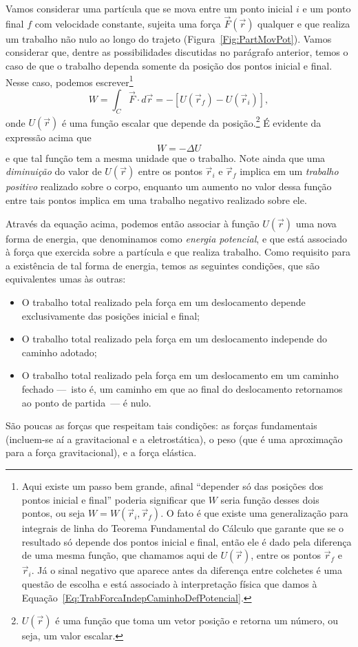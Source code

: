 Vamos considerar uma partícula que se mova entre um ponto inicial $i$ e um ponto final $f$ com velocidade constante, sujeita uma força $\vec{F}(\vec{r})$ qualquer e que realiza um trabalho não nulo ao longo do trajeto (Figura~\ref{Fig:PartMovPot}). Vamos considerar que, dentre as possibilidades discutidas no parágrafo anterior, temos o caso de que o trabalho dependa somente da posição dos pontos inicial e final. Nesse caso, podemos escrever\footnote{Aqui existe um passo bem grande, afinal ``depender só das posições dos pontos inicial e final'' poderia significar que $W$ seria função desses dois pontos, ou seja $W = W(\vec{r}_i, \vec{r}_f)$. O fato é que existe uma generalização para integrais de linha do Teorema Fundamental do Cálculo que garante que se o resultado só depende dos pontos inicial e final, então ele é dado pela diferença de uma mesma função, que chamamos aqui de $U(\vec{r})$, entre os pontos $\vec{r}_f$ e $\vec{r}_i$. Já o sinal negativo que aparece antes da diferença entre colchetes é uma questão de escolha e está associado à interpretação física que damos à Equação~\eqref{Eq:TrabForcaIndepCaminhoDefPotencial}.}
\begin{equation}\label{Eq:TrabForcaIndepCaminhoDefPotencial}
    W = \int_C \vec{F}\cdot d\vec{r} = -[U(\vec{r}_f) - U(\vec{r}_i)],
\end{equation}
%
onde $U(\vec{r})$ é uma função escalar que depende da posição.\footnote{$U(\vec{r})$ é uma função que toma um vetor posição e retorna um número, ou seja, um valor escalar.} É evidente da expressão acima que
\begin{equation}
    W = - \Delta U
\end{equation}
%
e que tal função tem a mesma unidade que o trabalho. Note ainda que uma \emph{diminuição} do valor de $U(\vec{r})$ entre os pontos $\vec{r}_i$ e $\vec{r}_f$ implica em um \emph{trabalho positivo} realizado sobre o corpo, enquanto um aumento no valor dessa função entre tais pontos implica em uma trabalho negativo realizado sobre ele.

Através da equação acima, podemos então associar à função $U(\vec{r})$ uma nova forma de energia, que denominamos como \emph{energia potencial}, e que está associado à força que exercida sobre a partícula e que realiza trabalho. Como requisito para a existência de tal forma de energia, temos as seguintes condições, que são equivalentes umas às outras:
\begin{itemize}
    \item O trabalho total realizado pela força em um deslocamento depende exclusivamente das posições inicial e final;
    \item O trabalho total realizado pela força em um deslocamento independe do caminho adotado;
    \item O trabalho total realizado pela força em um deslocamento em um caminho fechado ---~isto é, um caminho em que ao final do deslocamento retornamos ao ponto de partida~--- é nulo.
\end{itemize}
%
São poucas as forças que respeitam tais condições: as forças fundamentais (incluem-se aí a gravitacional e a eletrostática), o peso (que é uma aproximação para a força gravitacional), e a força elástica. 

